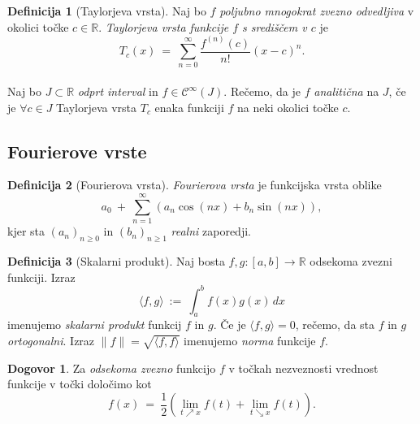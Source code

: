 \documentclass[11pt]{article}
\theoremstyle{definition}
\newtheorem{definicija}{Definicija}[section]
\theoremstyle{definition}
\theoremstyle{definition}
\theoremstyle{theorem}
\newtheorem*{dogovor}{Dogovor}
\begin{document}
\begin{definicija}[Taylorjeva vrsta]

Naj bo $f$ \textit{poljubno mnogokrat zvezno odvedljiva} v okolici točke $c \in \mathbb{R}$. \textit{Taylorjeva vrsta funkcije $f$ s središčem v $c$} je 
$$T_c(x) ~=~ \sum_{n=0}^{\infty} \frac{f^{(n)}(c)}{n!} (x-c)^n.$$ \\

Naj bo $J \subset \mathbb{R}$ \textit{odprt interval} in $f \in \mathcal{C}^{\infty}(J)$. Rečemo, da je $f$ \textit{analitična} na $J$, če je $\forall c \in J$ Taylorjeva vrsta $T_c$ enaka funkciji $f$ na neki okolici točke $c$.

\end{definicija}
\vspace{0.5cm}


\subsection{Fourierove vrste}
\vspace{0.5cm}

\begin{definicija}[Fourierova vrsta]

\textit{Fourierova vrsta} je funkcijska vrsta oblike
$$a_0 ~+~ \sum_{n=1}^{\infty} (a_n \cos(nx) + b_n \sin(nx)),$$
kjer sta $(a_n)_{n \geq 0}$ in $(b_n)_{n \geq 1}$ \textit{realni} zaporedji.

\end{definicija}
\vspace{0.5cm}

\begin{definicija}[Skalarni produkt]

Naj bosta $f, g: [a, b] \rightarrow \mathbb{R}$ odsekoma zvezni funkciji. Izraz
$$\langle f, g \rangle ~:=~ \int_{a}^{b} f(x) g(x)\,dx$$
imenujemo \textit{skalarni produkt} funkcij $f$ in $g$. Če je $\langle f, g \rangle = 0$, rečemo, da sta $f$ in $g$ \textit{ortogonalni}. Izraz $\| f \| = \sqrt{\langle f, f \rangle}$ imenujemo \textit{norma} funkcije $f$.

\end{definicija}
\vspace{0.5cm}

\begin{dogovor}

Za \textit{odsekoma zvezno} funkcijo $f$ v točkah nezveznosti vrednost funkcije v točki določimo kot
$$f(x) ~=~ \frac{1}{2} \left( \lim_{t \nearrow x} f(t) + \lim_{t \searrow x} f(t) \right).$$

\end{dogovor}
\vspace{0.5cm}
\end{document}
